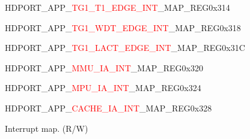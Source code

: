 \vspace{-3em}\begin{register}{H}{DPORT\_APP\_\textcolor{red}{TG1\_T1\_EDGE\_INT}\_MAP\_REG}{0x314}\label{regdesc:APPTG1T1EDGEINTMAPREG}
\end{register}
\vspace{-3em}
\begin{register}{H}{DPORT\_APP\_\textcolor{red}{TG1\_WDT\_EDGE\_INT}\_MAP\_REG}{0x318}\label{regdesc:APPTG1WDTEDGEINTMAPREG}
\end{register}
\vspace{-3em}
\begin{register}{H}{DPORT\_APP\_\textcolor{red}{TG1\_LACT\_EDGE\_INT}\_MAP\_REG}{0x31C}\label{regdesc:APPTG1LACTEDGEINTMAPREG}
\end{register}
\vspace{-3em}
\begin{register}{H}{DPORT\_APP\_\textcolor{red}{MMU\_IA\_INT}\_MAP\_REG}{0x320}\label{regdesc:APPMMUIAINTMAPREG}
\end{register}
\vspace{-3em}
\begin{register}{H}{DPORT\_APP\_\textcolor{red}{MPU\_IA\_INT}\_MAP\_REG}{0x324}\label{regdesc:APPMPUIAINTMAPREG}
\end{register}
\vspace{-3em}
\begin{register}{H}{DPORT\_APP\_\textcolor{red}{CACHE\_IA\_INT}\_MAP\_REG}{0x328}\label{regdesc:APPCACHEIAINTMAPREG}
%
%
\regnewline%
\begin{regdesc}\begin{reglist}
\item [DPORT\_APP\_\textcolor{red}{*}\_MAP]Interrupt map. (R/W)
\end{reglist}\end{regdesc}
\end{register}


